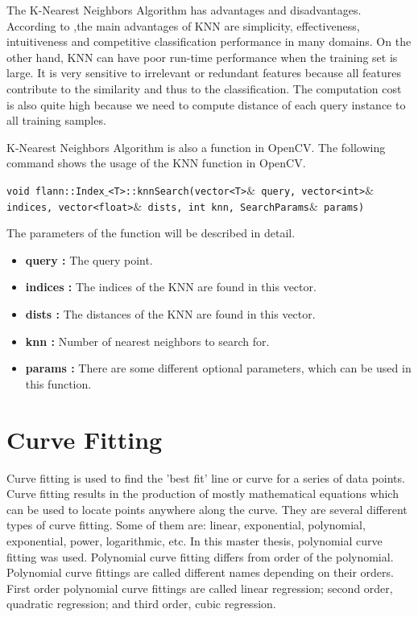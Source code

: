 The K-Nearest Neighbors Algorithm has advantages and disadvantages. According to \cite{k_nearest_neighbors_adv_disadv},the main advantages of KNN are simplicity, effectiveness, intuitiveness and competitive classification performance in many domains. On the other hand, KNN can have poor run-time performance when the training set is large. It is very sensitive to irrelevant or redundant features because all features contribute to the similarity and thus to the classification. The computation cost is also quite high because we need to compute distance of each query instance to all training samples. 

K-Nearest Neighbors Algorithm is also a function in OpenCV. The following command shows the usage of the KNN function in OpenCV.

\begin{center}

\texttt{void flann::Index$\_$<T>::knnSearch(vector<T>$\&$ query, vector<int>$\&$ indices, vector<float>$\&$ dists, int knn, SearchParams$\&$ params)}

\end{center}

The parameters of the function will be described in detail.\cite{k_nearest_neighbors_OpenCV}

\begin{itemize}

\item \textbf{query : }The query point.

\item \textbf{indices : }The indices of the KNN are found in this vector.

\item \textbf{dists : }The distances of the KNN are found in this vector.

\item \textbf{knn : }Number of nearest neighbors to search for.

\item \textbf{params : }There are some different optional parameters, which can be used in this function.

\end{itemize}


%
\section{Curve Fitting}\label{sec:Curve Fitting}

Curve fitting is used to find the 'best fit' line or curve for a series of data points. Curve fitting results in the production of mostly mathematical equations which can be used to locate points anywhere along the curve. They are several different types of curve fitting. Some of them are\cite{Curve_Fitting}: linear, exponential, polynomial, exponential, power, logarithmic, etc. In this master thesis, polynomial curve fitting was used. Polynomial curve fitting differs from order of the polynomial. Polynomial curve fittings are called different names depending on their orders. First order polynomial curve fittings are called linear regression; second order, quadratic regression; and third order, cubic regression.


